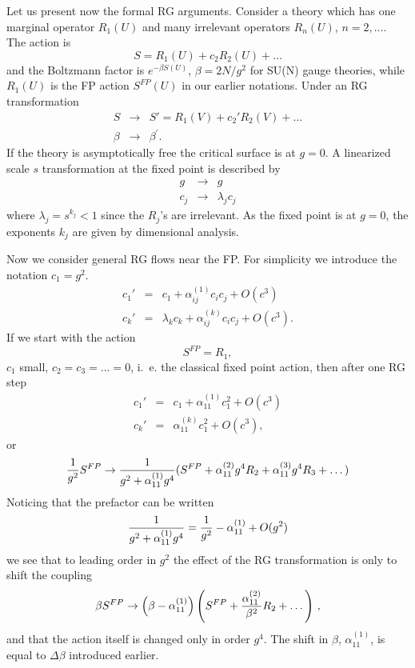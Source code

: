 Let us present now the formal RG arguments. Consider a theory 
which has one marginal operator $R_1(U)$
and many irrelevant operators $R_n(U)$, $n=2,\dots$.
The action is
\begin{equation}
S = R_1(U) + c_2 R_2(U) + \dots
\label{ACT}
\end{equation}
and the Boltzmann factor is
$e^{-\beta S(U)}$, $\beta= 2N/ g^2$ for SU(N) gauge theories,
while $R_1(U)$ is the FP action $S^{FP}(U)$ in our earlier 
notations.
Under an RG transformation 
\begin{eqnarray}
S  & \longrightarrow & S'  = R_1(V) + c_2' R_2(V) + \dots
\nonumber \\
\beta & \longrightarrow & \beta^{\prime}.
\label{RGFLOW}
\end{eqnarray}
If the theory is asymptotically free the critical surface is at $g=0$.
A linearized scale
$s$ 
transformation at the fixed point is described by 
\begin{eqnarray}
g & \rightarrow & g \\
c_j & \rightarrow &\lambda_j c_j 
\end{eqnarray}
where $\lambda_j = s^{k_j} <1$ since the $R_j$'s are irrelevant.
As the fixed point is  at $g =0$,
the exponents $k_j$ are given by dimensional analysis.

Now we consider   general RG flows near the FP. For simplicity we
introduce the notation $c_1=g^2$.
\begin{eqnarray}
c_1' & = &c_1 + \alpha_{ij}^{(1)}c_i c_j  +O(c^3) \\
c_k' & = &\lambda_k c_k + \alpha_{ij}^{(k)}c_i c_j +O(c^3)  .
\end{eqnarray}
If we start with the action 
\begin{equation}
 S^{FP} = R_1,
\end{equation}
$c_1$ small, $c_2=c_3=...=0$, i.~e. the classical fixed point action,
then after one  RG step
\begin{eqnarray}
c_1' & = &c_1 + \alpha_{11}^{(1)}c_1^2  +O(c^3) \\
c_k' & = & \alpha_{11}^{(k)}c_1^2  +O(c^3) ,
\end{eqnarray}
or
\begin{equation}
{1\over g^2} S^{FP} \rightarrow {1\over{g^2 + \alpha_{11}^{(1)}g^4}}
(S^{FP} + \alpha_{11}^{(2)} g^4 R_2 +  \alpha_{11}^{(3)} g^4 R_3 + \dots) 
\end{equation}
Noticing that the prefactor can be written
\begin{equation}
{1\over{g^2 + \alpha_{11}^{(1)}g^4}} = {1\over {g^2}} - \alpha_{11}^{(1)}
+O(g^2)
\end{equation}
we see that to leading order in $g^2$ the effect of the RG transformation
is  only to shift the coupling
\begin{equation}
\beta S^{FP} \rightarrow\left(\beta - \alpha_{11}^{(1)}\right)
\left( S^{FP} + {{\alpha_{11}^{(2)} }\over {\beta^2}} R_2 + \dots
\right)\,,
\end{equation}
and that the action itself is changed only in order $g^4$.
The shift in $\beta$, $\alpha^{(1)}_{11}$, is equal to $\Delta\beta$
introduced earlier.

